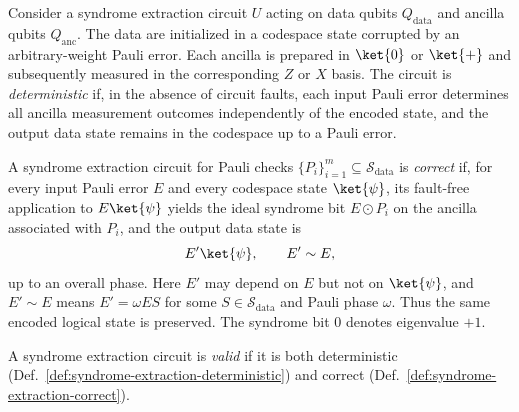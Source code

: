 
\begin{definition}
\label{def:syndrome-extraction-deterministic}
Consider a syndrome extraction circuit $U$ acting on data qubits
$Q_{\text{data}}$ and ancilla qubits $Q_{\text{anc}}$.
The data are initialized in a codespace state corrupted by an
arbitrary-weight Pauli error. Each ancilla is prepared in $\ket{0}$
or $\ket{+}$ and subsequently measured in the corresponding $Z$
or $X$ basis. The circuit is \emph{deterministic} if, in the absence
of circuit faults, each input Pauli error determines all ancilla
measurement outcomes independently of the encoded state, and the
output data state remains in the codespace up to a Pauli error.
\end{definition}

\begin{definition}
\label{def:syndrome-extraction-correct}
A syndrome extraction circuit for Pauli checks
$\{P_i\}_{i=1}^{m}\subseteq\mathcal{S}_{\mathrm{data}}$ is
\emph{correct} if, for every input Pauli error $E$ and every
codespace state $\ket{\psi}$, its fault-free application to
$E\ket{\psi}$ yields the ideal syndrome bit $E\odot P_i$ on the
ancilla associated with $P_i$, and the output data state is
\[
    E'\ket{\psi}, \qquad E'\sim E,
\]
up to an overall phase. Here $E'$ may depend on $E$ but not on
$\ket{\psi}$, and $E'\sim E$ means $E'=\omega ES$ for some
$S\in\mathcal{S}_{\mathrm{data}}$ and Pauli phase $\omega$.
Thus the same encoded logical state is preserved.
The syndrome bit $0$ denotes eigenvalue $+1$.
\end{definition}

\begin{definition}
\label{def:syndrome-extraction-valid}
A syndrome extraction circuit is \emph{valid} if it is both
deterministic (Def.~\ref{def:syndrome-extraction-deterministic})
and correct (Def.~\ref{def:syndrome-extraction-correct}).
\end{definition}

